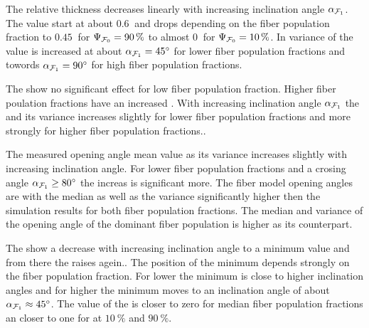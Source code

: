 \par
The relative thickness \trel{} decreases linearly with increasing inclination angle $\textnormal{$\alpha$}_{\textnormal{$\mathcal{F}_1$}}$.
The \trel{} value start at about $\SI{0.6}{}$ and drops depending on the fiber population fraction \modelPsi{} to $\SI{0.45}{}$ for $\textnormal{$\Psi_{\textnormal{$\mathcal{F}_0$}}$}=\SI{90}{\percent}$ to almost $\SI{0}{}$ for $\textnormal{$\Psi_{\textnormal{$\mathcal{F}_0$}}$}=\SI{10}{\percent}$.
In variance of the \trel{} value is increased at about $\textnormal{$\alpha$}_{\textnormal{$\mathcal{F}_1$}}=\SI{45}{\degree}$ for lower fiber population fractions and towords $\textnormal{$\alpha$}_{\textnormal{$\mathcal{F}_1$}}=\SI{90}{\degree}$ for high fiber population fractions.
\par
The \rvalue{} show no significant effect for low fiber population fraction. 
Higher fiber poulation fractions have an increased \rvalue{}.
With increasing inclination angle $\textnormal{$\alpha$}_{\textnormal{$\mathcal{F}_1$}}$ the \rvalue{} and its variance increases slightly for lower fiber population fractions and more strongly for higher fiber population fractions..
\par
The measured opening angle \openingAngle{} mean value as its variance increases slightly with increasing inclination angle.
For lower fiber population fractions and a crosing angle $\textnormal{$\alpha$}_{\textnormal{$\mathcal{F}_1$}} \geq \SI{80}{\degree}$ the increas is significant more.
The fiber model opening angles are with the median as well as the \bvariance{} variance significantly higher then the simulation results for both fiber population fractions.
The median and \bvariance{} variance of the opening angle of the dominant fiber population is higher as its counterpart.
\par
The \accvalue{} show a decrease with increasing inclination angle to a minimum value and from there the \accvalue{} raises agein..
The position of the minimum depends strongly on the fiber population fraction.
For lower \modelPsi{} the minimum is close to higher inclination angles and for higher \modelPsi{} the minimum moves to an inclination angle of about $\textnormal{$\alpha$}_{\textnormal{$\mathcal{F}_1$}} \approx \SI{45}{\degree}$.
The value of the \accvalue is closer to zero for median fiber population fractions an closer to one for \modelPsi{} at $\SI{10}{\percent}$ and $\SI{90}{\percent}$.
%
% 
% 
